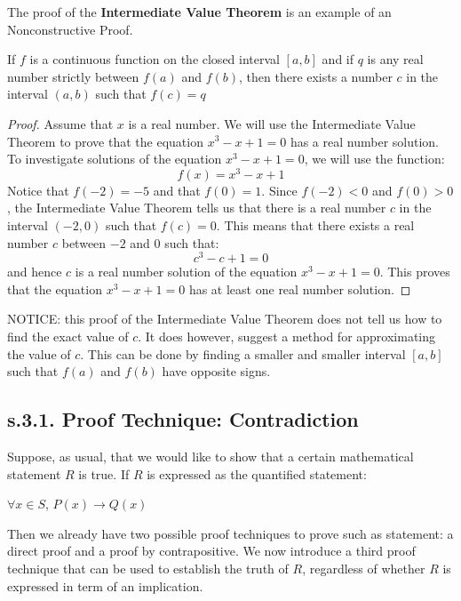 \begin{example}
The proof of the {\bf Intermediate Value Theorem} is an example of an Nonconstructive Proof.

\begin{tcolorbox}
	\begin{theorem}
		If $f$ is a continuous function on the closed interval $[a,b]$ and if $q$ is any real number strictly between $f(a)$ and $f(b)$, then there exists a number $c$ in the interval $(a,b)$ such that $f(c) = q$
	\end{theorem}
\end{tcolorbox}

\begin{proof}
Assume that $x$ is a real number. We will use the Intermediate Value Theorem to prove that the equation $x^3 - x + 1 = 0$ has a real number solution. \\
To investigate solutions of the equation $x^3 - x + 1 = 0$, we will use the function: 
	\begin{equation}
		f(x) = x^3 - x + 1 \nonumber
	\end{equation}
Notice that $f(-2) = - 5$ and that $f(0) = 1$. Since $f(-2) < 0$ and $f(0) > 0$, the Intermediate Value Theorem tells us that there is a real number $c$ in the interval $(-2, 0)$ such that $f(c) = 0$. This means that there exists a real number $c$ between $-2$ and $0$ such that: 
	\begin{equation}
		c^3 - c + 1 = 0 \nonumber
	\end{equation}
and hence $c$ is a real number solution of the equation $x^3 - x  + 1 = 0$. This proves that the equation $x^3 - x + 1 = 0$ has at least one real number solution. 
\end{proof}

NOTICE: this proof of the Intermediate Value Theorem does not tell us how to find the exact value of $c$. It does however, suggest a method for approximating the value of $c$. This can be done by finding a smaller and smaller interval $[a, b]$ such that $f(a)$ and $f(b)$ have opposite signs. 
\end{example}









\newpage
\subsection{s.3.1. Proof Technique: Contradiction}
Suppose, as usual, that we would like to show that a certain mathematical statement $R$ is true. If $R$ is expressed as the quantified statement: 
	\begin{center}
 		$\forall x \in S$, $P(x) \to Q(x)$
	\end{center}	  
Then we already have two possible proof techniques to prove such as statement: a direct proof and a proof by contrapositive. We now introduce a third proof technique that can be used to establish the truth of $R$, regardless of whether $R$ is expressed in term of an implication. \\ 

